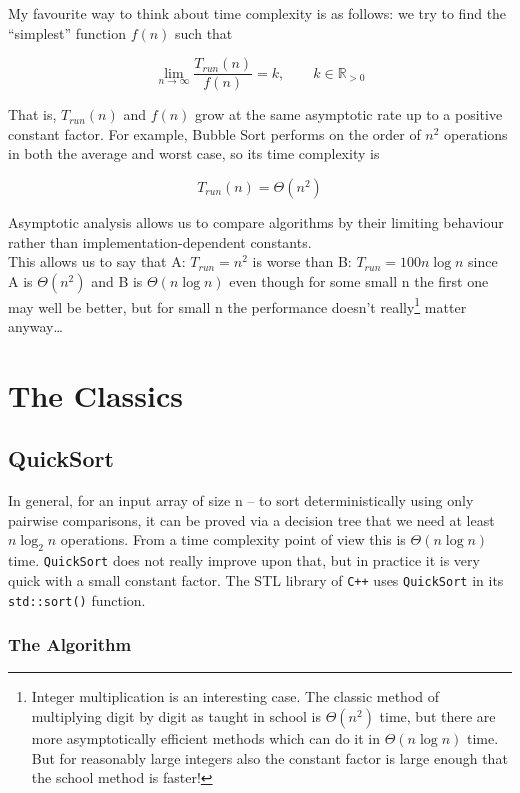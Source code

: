 \documentclass[11pt,openany]{book}
\begin{document}
\noindent My favourite way to think about time complexity is as follows: we try to find the ``simplest'' function \(f(n)\) such that

\[
\lim_{n\to\infty}\frac{T_{run}(n)}{f(n)}=k,
\qquad
k\in\mathbb{R}_{>0}
\]

\noindent That is, \(T_{run}(n)\) and \(f(n)\) grow at the same asymptotic rate up to a positive constant factor.
\noindent For example, Bubble Sort performs on the order of \(n^2\) operations in both the average and worst case, so its time complexity is

\[
T_{run}(n)=\Theta(n^2)
\]

\noindent Asymptotic analysis allows us to compare algorithms by their 
limiting behaviour rather than implementation-dependent constants.\\


\noindent This allows us to say that A: $T_{run}=n^2$ is worse than B: $T_{run}=100n\log n$ since A is $\Theta(n^2)$
 and B is $\Theta(n\log n)$ even though for some small n the first one may
 well be better, but for small n the performance doesn't really\footnote{Integer multiplication
 is an interesting case. The classic method of multiplying digit by digit as taught in school is $\Theta(n^2)$
 time, but there are more asymptotically efficient methods which can do it in $\Theta(n\log n)$ time. But 
 for reasonably large integers also the constant factor is large enough that the school method is faster!}
  matter anyway\dots

\chapter{The Classics}
\section{QuickSort}

In general, for an input array of size n -- to sort deterministically using only pairwise comparisons,
it can be proved via a decision tree that we need at least $n\log_2 n$ operations. From a 
time complexity point of view this is $\Theta(n\log n)$ time. \texttt{QuickSort} does not really improve upon that, but 
in practice it is very quick with a small constant factor. The STL 
library of \texttt{C++} uses \texttt{QuickSort} in its \texttt{std::sort()} function.\\

\subsection{The Algorithm}
\end{document}
